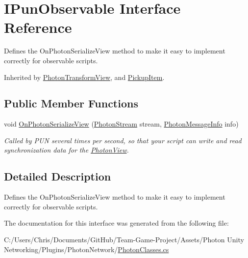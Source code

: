 \hypertarget{interface_i_pun_observable}{}\section{I\+Pun\+Observable Interface Reference}
\label{interface_i_pun_observable}


Defines the On\+Photon\+Serialize\+View method to make it easy to implement correctly for observable scripts.  




Inherited by \hyperlink{class_photon_transform_view}{Photon\+Transform\+View}, and \hyperlink{class_pickup_item}{Pickup\+Item}.

\subsection*{Public Member Functions}
\begin{DoxyCompactItemize}
\item 
void \hyperlink{group__public_api_ga78c69bbb6f79d1e4fb23d3f761eaf4aa}{On\+Photon\+Serialize\+View} (\hyperlink{class_photon_stream}{Photon\+Stream} stream, \hyperlink{class_photon_message_info}{Photon\+Message\+Info} info)
\begin{DoxyCompactList}\small\item\em Called by P\+UN several times per second, so that your script can write and read synchronization data for the \hyperlink{class_photon_view}{Photon\+View}. \end{DoxyCompactList}\end{DoxyCompactItemize}


\subsection{Detailed Description}
Defines the On\+Photon\+Serialize\+View method to make it easy to implement correctly for observable scripts. 



The documentation for this interface was generated from the following file\+:\begin{DoxyCompactItemize}
\item 
C\+:/\+Users/\+Chris/\+Documents/\+Git\+Hub/\+Team-\/\+Game-\/\+Project/\+Assets/\+Photon Unity Networking/\+Plugins/\+Photon\+Network/\hyperlink{_photon_classes_8cs}{Photon\+Classes.\+cs}\end{DoxyCompactItemize}
